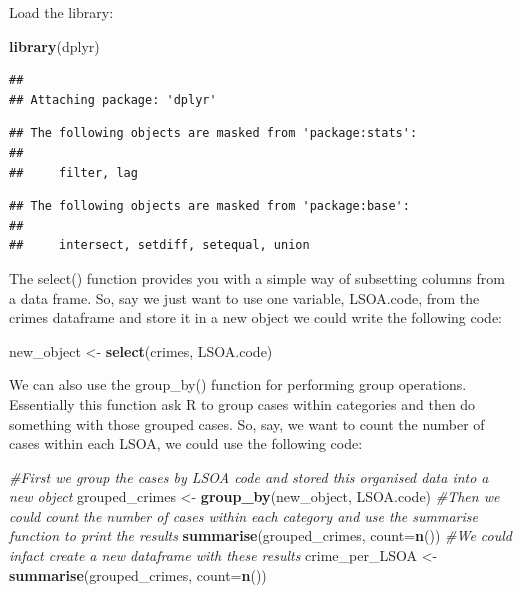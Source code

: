 \documentclass[]{book}
\newenvironment{Shaded}{\begin{snugshade}}{\end{snugshade}}
\newcommand{\CommentTok}[1]{\textcolor[rgb]{0.56,0.35,0.01}{\textit{#1}}}
\newcommand{\DataTypeTok}[1]{\textcolor[rgb]{0.13,0.29,0.53}{#1}}
\newcommand{\KeywordTok}[1]{\textcolor[rgb]{0.13,0.29,0.53}{\textbf{#1}}}
\newcommand{\NormalTok}[1]{#1}
\newcommand{\StringTok}[1]{\textcolor[rgb]{0.31,0.60,0.02}{#1}}
\begin{document}
Load the library:

\begin{Shaded}
\begin{Highlighting}[]
\KeywordTok{library}\NormalTok{(dplyr)}
\end{Highlighting}
\end{Shaded}

\begin{verbatim}
## 
## Attaching package: 'dplyr'
\end{verbatim}

\begin{verbatim}
## The following objects are masked from 'package:stats':
## 
##     filter, lag
\end{verbatim}

\begin{verbatim}
## The following objects are masked from 'package:base':
## 
##     intersect, setdiff, setequal, union
\end{verbatim}

The select() function provides you with a simple way of subsetting columns from a data frame. So, say we just want to use one variable, LSOA.code, from the crimes dataframe and store it in a new object we could write the following code:

\begin{Shaded}
\begin{Highlighting}[]
\NormalTok{new_object <-}\StringTok{ }\KeywordTok{select}\NormalTok{(crimes, LSOA.code)}
\end{Highlighting}
\end{Shaded}

We can also use the group\_by() function for performing group operations. Essentially this function ask R to group cases within categories and then do something with those grouped cases. So, say, we want to count the number of cases within each LSOA, we could use the following code:

\begin{Shaded}
\begin{Highlighting}[]
\CommentTok{#First we group the cases by LSOA code and stored this organised data into a new object}
\NormalTok{grouped_crimes <-}\StringTok{ }\KeywordTok{group_by}\NormalTok{(new_object, LSOA.code)}
\CommentTok{#Then we could count the number of cases within each category and use the summarise function to print the results}
\KeywordTok{summarise}\NormalTok{(grouped_crimes, }\DataTypeTok{count=}\KeywordTok{n}\NormalTok{())}
\CommentTok{#We could infact create a new dataframe with these results}
\NormalTok{crime_per_LSOA <-}\StringTok{ }\KeywordTok{summarise}\NormalTok{(grouped_crimes, }\DataTypeTok{count=}\KeywordTok{n}\NormalTok{())}
\end{Highlighting}
\end{Shaded}
\end{document}
